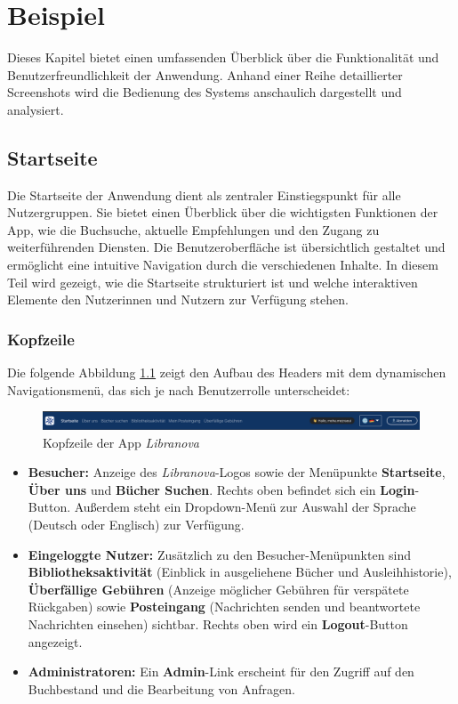 \chapter{Beispiel}

Dieses Kapitel bietet einen umfassenden Überblick über die Funktionalität und Benutzerfreundlichkeit der Anwendung. Anhand einer Reihe detaillierter Screenshots wird die Bedienung des Systems anschaulich dargestellt und analysiert. 

\section{Startseite}

Die Startseite der Anwendung dient als zentraler Einstiegspunkt für alle Nutzergruppen. Sie bietet einen Überblick über die wichtigsten Funktionen der App, wie die Buchsuche, aktuelle Empfehlungen und den Zugang zu weiterführenden Diensten. Die Benutzeroberfläche ist übersichtlich gestaltet und ermöglicht eine intuitive Navigation durch die verschiedenen Inhalte. In diesem Teil wird gezeigt, wie die Startseite strukturiert ist und welche interaktiven Elemente den Nutzerinnen und Nutzern zur Verfügung stehen.

\subsection{Kopfzeile}
Die folgende Abbildung \ref{fig:header} zeigt den Aufbau des Headers mit dem dynamischen Navigationsmenü, das sich je nach Benutzerrolle unterscheidet:

\begin{figure}[H]
	\centering
	\includegraphics[width=1.0\textwidth]{images/UI-screenshots/Header.png}
	\caption{ Kopfzeile der App \textit{Libranova}}
	\label{fig:header}
\end{figure}

\begin{itemize}
	\item \textbf{Besucher:} Anzeige des \textit{Libranova}-Logos sowie der Menüpunkte \textbf{Startseite}, \textbf{Über uns} und  \textbf{Bücher Suchen}. Rechts oben befindet sich ein \textbf{Login}-Button. Außerdem steht ein Dropdown-Menü zur Auswahl der Sprache (Deutsch oder Englisch) zur Verfügung.
	\item \textbf{Eingeloggte Nutzer:} Zusätzlich zu den Besucher-Menüpunkten sind \textbf{Bibliotheksaktivität} (Einblick in ausgeliehene Bücher und Ausleihhistorie), \textbf{Überfällige Gebühren} (Anzeige möglicher Gebühren für verspätete Rückgaben) sowie \textbf{Posteingang} (Nachrichten senden und beantwortete Nachrichten einsehen) sichtbar. Rechts oben wird ein \textbf{Logout}-Button angezeigt.
	\item \textbf{Administratoren:} Ein \textbf{Admin}-Link erscheint für den Zugriff auf den Buchbestand und die Bearbeitung von Anfragen.

\end{itemize}

